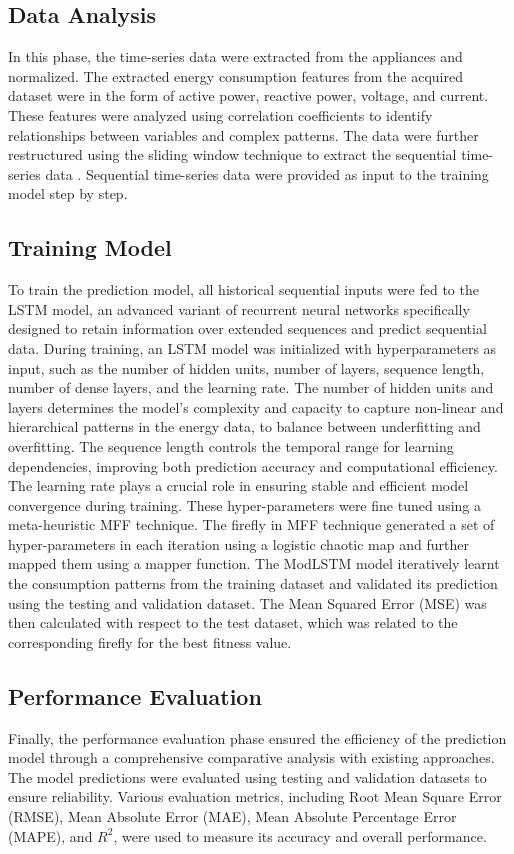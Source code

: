 \documentclass[journal]{IEEEtran}
\begin{document}
\subsection{Data Analysis}
In this phase, the time-series data were extracted from the appliances and normalized. The extracted energy consumption features from the acquired dataset were in the form of active power, reactive power, voltage, and current. These features were analyzed using correlation coefficients to identify relationships between variables and complex patterns.
The data were further restructured using the sliding window technique to extract the sequential time-series data \cite{Ref2}. Sequential time-series data were provided as input to the training model step by step.

\subsection{Training Model}
To train the prediction model, all historical sequential inputs were fed to the LSTM model, an advanced variant of recurrent neural networks specifically designed to retain information over extended sequences and predict sequential data. During training, an LSTM model was initialized with hyperparameters as input, such as the number of hidden units, number of layers, sequence length, number of dense layers, and the learning rate. The number of hidden units and layers determines the model's complexity and capacity to capture non-linear and hierarchical patterns in the energy data, to balance between underfitting and overfitting. The sequence length controls the temporal range for learning dependencies, improving both prediction accuracy and computational efficiency. The learning rate plays a crucial role in ensuring stable and efficient model convergence during training. These hyper-parameters were fine tuned using a meta-heuristic MFF technique. The firefly in MFF technique generated a set of hyper-parameters in each iteration using a logistic chaotic map and further mapped them using a mapper function. The ModLSTM model iteratively learnt the consumption patterns from the training dataset and validated its prediction using the testing and validation dataset. The Mean Squared Error (MSE) was then calculated with respect to the test dataset, which was related to the corresponding firefly for the best fitness value. 

\subsection{Performance Evaluation}
Finally, the performance evaluation phase ensured the efficiency of the prediction model through a comprehensive comparative analysis with existing approaches. The model predictions were evaluated using testing and validation datasets to ensure reliability. Various evaluation metrics, including Root Mean Square Error (RMSE), Mean Absolute Error (MAE), Mean Absolute Percentage Error (MAPE), and $R^2$, were used to measure its accuracy and overall performance.  
\end{document}
